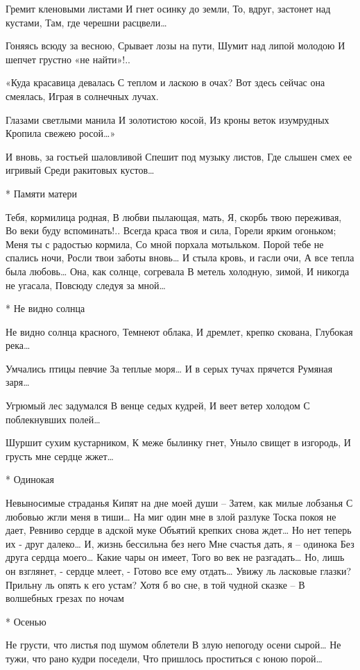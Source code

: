 Гремит кленовыми листами
И гнет осинку до земли,
То, вдруг, застонет над кустами,
Там, где черешни расцвели…

Гоняясь всюду за весною,
Срывает лозы на пути,
Шумит над липой молодою
И шепчет грустно «не найти»!..

«Куда красавица девалась
С теплом и ласкою в очах?
Вот здесь сейчас она смеялась,
Играя в солнечных лучах.

Глазами светлыми манила
И золотистою косой,
Из кроны веток изумрудных
Кропила свежею росой…»

И вновь, за гостьей шаловливой
Спешит под музыку листов,
Где слышен смех ее игривый
Среди ракитовых кустов…


* Памяти матери

Тебя, кормилица родная,
В любви пылающая, мать,
Я, скорбь твою переживая,
Во веки буду вспоминать!..
Всегда краса твоя и сила,
Горели ярким огоньком;
Меня ты с радостью кормила,
Со мной порхала мотыльком.
Порой тебе не спались ночи,
Росли твои заботы вновь…
И стыла кровь, и гасли очи,
А все тепла была любовь…
Она, как солнце, согревала
В метель холодную, зимой,
И никогда не угасала,
Повсюду следуя за мной…


* Не видно солнца

Не видно солнца красного,
Темнеют облака,
И дремлет, крепко скована,
Глубокая река…

Умчались птицы певчие
За теплые моря…
И в серых тучах прячется
Румяная заря…

Угрюмый лес задумался
В венце седых кудрей,
И веет ветер холодом
С поблекнувших полей…

Шуршит сухим кустарником,
К меже былинку гнет,
Уныло свищет в изгородь,
И грусть мне сердце жжет…


* Одинокая

Невыносимые страданья
Кипят на дне моей души –
Затем, как милые лобзанья
С любовью жгли меня в тиши…
На миг один мне в злой разлуке
Тоска покоя не дает,
Ревниво сердце в адской муке
Объятий крепких снова ждет…
Но нет теперь их - друг далеко…
И, жизнь бессильна без него
Мне счастья дать, я – одинока
Без друга сердца моего…
Какие чары он имеет,
Того во век не разгадать…
Но, лишь он взглянет, - сердце млеет, -
Готово все ему отдать…
Увижу ль ласковые глазки?
Прильну ль опять к его устам?
Хотя б во сне, в той чудной сказке –
В волшебных грезах по ночам

* Осенью

Не грусти, что листья под шумом облетели
В злую непогоду осени сырой…
Не тужи, что рано кудри поседели,
Что пришлось проститься с юною порой…

